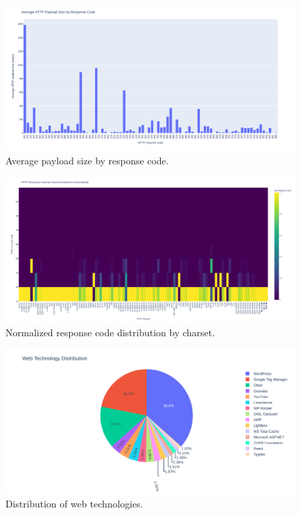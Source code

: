 \begin{figure}[H]
    \centering
    \includegraphics[width=\textheight, angle=90]{figures/charts/large/appendix/chart_source_response_code_bar_payload_size.png}
    \caption{Average payload size by response code.}
    \label{fig:analysis-dataset-chart_source_response_code_bar_payload_size}
\end{figure}

\begin{figure}[H]
    \centering
    \includegraphics[width=\textheight, angle=90]{figures/charts/large/appendix/chart_source_charset_heatmap_response_code.png}
    \caption{Normalized response code distribution by charset.}
    \label{fig:analysis-dataset-chart_source_charset_heatmap_response_code}
\end{figure}

\begin{figure}[H]
    \centering
    \includegraphics[width=\textheight, angle=90]{figures/charts/large/appendix/chart_fact_web_technology_pie.png}
    \caption{Distribution of web technologies.}
    \label{fig:analysis-dataset-chart_fact_web_technology_pie}
\end{figure}

